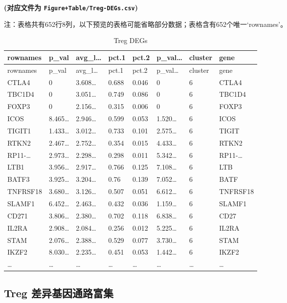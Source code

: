 \documentclass[
]{article}
\begin{document}
\textbf{(对应文件为 \texttt{Figure+Table/Treg-DEGs.csv})}

\begin{center}\begin{tcolorbox}[colback=gray!10, colframe=gray!50, width=0.9\linewidth, arc=1mm, boxrule=0.5pt]注：表格共有652行8列，以下预览的表格可能省略部分数据；表格含有652个唯一`rownames'。
\end{tcolorbox}
\end{center}

\begin{longtable}[]{@{}llllllll@{}}
\caption{\label{tab:Treg-DEGs}Treg DEGs}\tabularnewline
\toprule
rownames & p\_val & avg\_l\ldots{} & pct.1 & pct.2 & p\_val\ldots{} & cluster & gene\tabularnewline
\midrule
\endfirsthead
\toprule
rownames & p\_val & avg\_l\ldots{} & pct.1 & pct.2 & p\_val\ldots{} & cluster & gene\tabularnewline
\midrule
\endhead
CTLA4 & 0 & 3.608\ldots{} & 0.688 & 0.046 & 0 & 6 & CTLA4\tabularnewline
TBC1D4 & 0 & 3.051\ldots{} & 0.749 & 0.086 & 0 & 6 & TBC1D4\tabularnewline
FOXP3 & 0 & 2.156\ldots{} & 0.315 & 0.006 & 0 & 6 & FOXP3\tabularnewline
ICOS & 8.465\ldots{} & 2.946\ldots{} & 0.599 & 0.053 & 1.520\ldots{} & 6 & ICOS\tabularnewline
TIGIT1 & 1.433\ldots{} & 3.012\ldots{} & 0.733 & 0.101 & 2.575\ldots{} & 6 & TIGIT\tabularnewline
RTKN2 & 2.467\ldots{} & 2.752\ldots{} & 0.354 & 0.015 & 4.433\ldots{} & 6 & RTKN2\tabularnewline
RP11-\ldots{} & 2.973\ldots{} & 2.298\ldots{} & 0.298 & 0.011 & 5.342\ldots{} & 6 & RP11-\ldots{}\tabularnewline
LTB1 & 3.956\ldots{} & 2.917\ldots{} & 0.766 & 0.125 & 7.108\ldots{} & 6 & LTB\tabularnewline
BATF3 & 3.925\ldots{} & 3.204\ldots{} & 0.76 & 0.139 & 7.052\ldots{} & 6 & BATF\tabularnewline
TNFRSF18 & 3.680\ldots{} & 3.126\ldots{} & 0.507 & 0.051 & 6.612\ldots{} & 6 & TNFRSF18\tabularnewline
SLAMF1 & 6.452\ldots{} & 2.463\ldots{} & 0.432 & 0.036 & 1.159\ldots{} & 6 & SLAMF1\tabularnewline
CD271 & 3.806\ldots{} & 2.380\ldots{} & 0.702 & 0.118 & 6.838\ldots{} & 6 & CD27\tabularnewline
IL2RA & 2.908\ldots{} & 2.084\ldots{} & 0.256 & 0.012 & 5.225\ldots{} & 6 & IL2RA\tabularnewline
STAM & 2.076\ldots{} & 2.388\ldots{} & 0.529 & 0.077 & 3.730\ldots{} & 6 & STAM\tabularnewline
IKZF2 & 8.030\ldots{} & 2.235\ldots{} & 0.451 & 0.053 & 1.442\ldots{} & 6 & IKZF2\tabularnewline
\ldots{} & \ldots{} & \ldots{} & \ldots{} & \ldots{} & \ldots{} & \ldots{} & \ldots{}\tabularnewline
\bottomrule
\end{longtable}

\hypertarget{enrich}{%
\subsection{Treg 差异基因通路富集}\label{enrich}}
\end{document}

